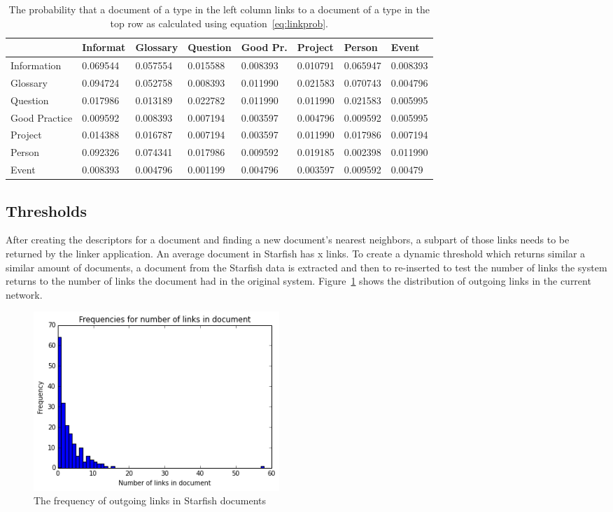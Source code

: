 \begin{table}[h!]
\center
\begin{tabular}{l | l l l l l l l}
 & Informat & Glossary & Question & Good Pr. & Project & Person &  Event \\ \hline
Information      & 0.069544 & 0.057554 & 0.015588 & 0.008393 & 0.010791 & 0.065947 & 0.008393\\
Glossary         & 0.094724 & 0.052758 & 0.008393 & 0.011990 & 0.021583 & 0.070743 & 0.004796\\
Question         & 0.017986 & 0.013189 & 0.022782 & 0.011990 & 0.011990 & 0.021583 & 0.005995\\
Good Practice    & 0.009592 & 0.008393 & 0.007194 & 0.003597 & 0.004796 & 0.009592 & 0.005995\\
Project          & 0.014388 & 0.016787 & 0.007194 & 0.003597 & 0.011990 & 0.017986 & 0.007194\\
Person           & 0.092326 & 0.074341 & 0.017986 & 0.009592 & 0.019185 & 0.002398 & 0.011990\\
Event            & 0.008393 & 0.004796 & 0.001199 & 0.004796 & 0.003597 & 0.009592 & 0.00479 
\end{tabular}
\caption{The probability that a document of a type in the left column links to a document of a type in the top row as calculated using equation~\ref{eq:linkprob}.}
\label{table:linkprob}
\end{table}

\subsection{Thresholds}
After creating the descriptors for a document and finding a new document's
nearest neighbors, a subpart of those links needs to be returned by the linker
application. An average document in Starfish has x links. To create a dynamic
threshold which returns similar a similar amount of documents, a document from
the Starfish data is extracted and then to re-inserted to test the number of
links the system returns to the number of links the document had in the
original system. Figure~\ref{fig:link_histogram} shows the distribution of
outgoing links in the current network.

\begin{figure}[h]
\centering
\includegraphics[width =0.45\textwidth]{images/link_histogram}
\caption{The frequency of outgoing links in Starfish documents}
\label{fig:link_histogram}
\end{figure}

